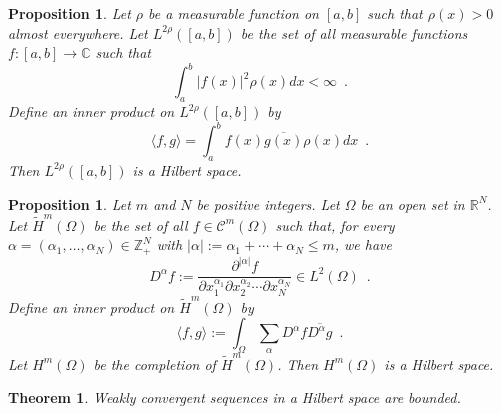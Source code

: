 \documentclass{book}
\newtheorem{prop}[ax]{Proposition}
\newtheorem{thm}[ax]{Theorem}
\theoremstyle{definition}
\begin{document}
\begin{prop}
Let $\rho$ be a measurable function on $[a,b]$ such that $\rho(x) > 0$ almost everywhere. Let $L^{2\rho}([a,b])$ be the set of all measurable functions $f : [a,b] \rightarrow \mathbb{C}$ such that
\[ \int_a^b |f(x)|^2 \rho(x) dx < \infty \enspace . \]
Define an inner product on $L^{2\rho}([a,b])$ by
\[ \langle f,g \rangle = \int_a^b f(x) \overline{g(x)} \rho(x) dx \enspace . \]
Then $L^{2\rho}([a,b])$ is a Hilbert space.
\end{prop}

\begin{prop}
Let $m$ and $N$ be positive integers.
Let $\Omega$ be an open set in $\mathbb{R}^N$. Let $\tilde{H}^m(\Omega)$ be the set of all $f \in \mathcal{C}^m(\Omega)$ such that, for every $\alpha = (\alpha_1, \ldots, \alpha_N) \in \mathbb{Z}_+^N$ with $|\alpha| := \alpha_1 + \cdots + \alpha_N \leq m$, we have 
\[ D^\alpha f := \frac{\partial^{|\alpha|} f}{\partial x_1^{\alpha_1} \partial x_2^{\alpha_2} \cdots \partial x_N^{\alpha_N}} \in L^2(\Omega) \enspace . \]
Define an inner product on $\tilde{H}^m(\Omega)$ by
\[ \langle f,g \rangle := \int_\Omega \sum_\alpha D^\alpha f \overline{D^\alpha g} \enspace . \]
Let $H^m(\Omega)$ be the completion of $\tilde{H}^m(\Omega)$. Then $H^m(\Omega)$ is a Hilbert space.
\end{prop}

\begin{thm}
Weakly convergent sequences in a Hilbert space are bounded.
\end{thm}
\end{document}
